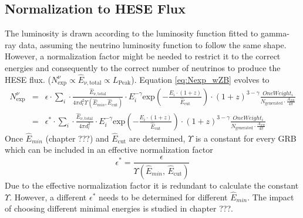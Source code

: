 \subsection{Normalization to HESE Flux}
\label{sec:norm2HESE}
The luminosity is drawn according to the luminosity function fitted to
gamma-ray data, assuming the neutrino luminosity function to follow the
same shape. However, a normalization factor might be needed to restrict it to 
the
correct energies and consequently to the correct number of neutrinos to produce
the HESE flux. ($N_\text{exp}^\nu \propto \hat{E}_{\nu, \text{total}} \propto
L_\text{Peak}$). Equation \ref{eq:Nexp_wZB} evolves to
\begin{eqnarray}
\label{eqn:Nexp_wZB_wEps}
 N_\text{exp}^\nu &= & \epsilon \cdot \sum_i \cdot \frac{\hat{E}_{\nu,
\text{total}}}{4 \pi
d_l^2\Upsilon\left(\hat{E}_{min}, \hat{E}_\text{cut}\right)} \cdot
E_i^{-\gamma}
\text{exp} \left( - \frac{E_i \cdot (1+z)}{\hat{E}_\text{cut}} \right) \cdot
(1+z)^{3 - \gamma}
\frac{OneWeight_i}{N_\text{generated} \cdot \frac{A_{ZB}}{4 \pi}} \\
&= & \epsilon^* \cdot \sum_i \cdot \frac{\hat{E}_{\nu, \text{total}}}{4 \pi
d_l^2} \cdot
E_i^{-\gamma}
\text{exp} \left( - \frac{E_i \cdot (1+z)}{\hat{E}_\text{cut}} \right) \cdot
(1+z)^{3 - \gamma}
\frac{OneWeight_i}{N_\text{generated} \cdot \frac{A_{ZB}}{4 \pi}}
\label{eqn:Nexp_wZB_wEpsStar}
\end{eqnarray}
Once $\hat{E}_{min}$ (chapter ???) and $\hat{E}_\text{cut}$ are determined,
$\Upsilon$ is a constant for every GRB which can be included in an effective
normalization factor
\begin{equation}
\epsilon^* =
\frac{\epsilon}{\Upsilon\left(\hat{E}_{min}, \, \hat{E}_\text{cut}\right)}
\end{equation}
Due to the effective normalization factor it is redundant to calculate the
constant $\Upsilon$. However, a different $\epsilon^*$ needs to be determined
for different $\hat{E}_{min}$. The impact of choosing different minimal
energies is studied in chapter ???.

